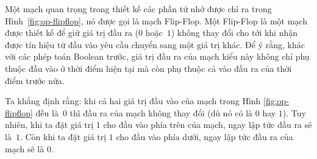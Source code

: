 Một mạch quan trọng trong thiết kế các phần tử nhớ được chỉ ra trong Hình~\ref{fig:op-flipflop}, nó được gọi là mạch Flip-Flop. Một Flip-Flop là một mạch được thiết
kế để giữ giá trị đầu ra ($0$ hoặc~$1$) không thay đổi cho tới khi nhận được tín hiệu từ
đầu vào yêu cầu chuyển sang một giá trị khác. Để ý rằng, khác với các phép toán Boolean
trước, giá trị đầu ra của mạch kiểu này không chỉ phụ thuộc đầu vào ở thời điểm hiện tại
mà còn phụ thuộc cả vào đầu ra của thời điểm trước nữa.

Ta khẳng định rằng: khi cả hai giá trị đầu vào của mạch trong Hình \ref{fig:op-flipflop}
đều là~$0$ thì đầu ra của mạch không thay đổi (dù nó có là $0$ hay $1$). Tuy nhiên, khi ta
đặt giá trị $1$ cho đầu vào phía trên của mạch, ngay lập tức đầu ra sẽ là~$1$. Còn khi ta
đặt giá trị $1$ cho đầu vào phía dưới, ngay lập tức đầu ra của mạch sẽ là $0$.


